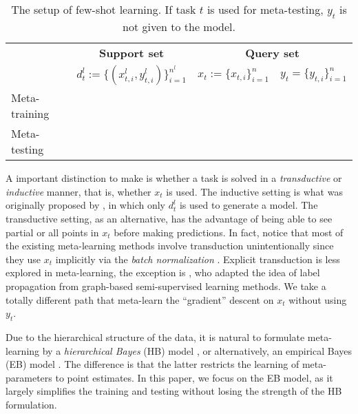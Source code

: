\documentclass{article} \usepackage{iclr2020_conference,times}
\newcommand{\chk}{{\centering\checkmark}}
\newcommand{\xmark}{\ding{55}}
\newcommand{\crs}{{\centering\xmark}}
\newcommand{\nt}{n}
\begin{document}
\begin{table}[ht]
    \centering
	\begin{tabular}{lccc}
    \toprule
        & \multicolumn{1}{c}{\textbf{Support set}} & \multicolumn{2}{c}{\textbf{Query set}} \\
        & $d_t^{l} := \{(x_{t,i}^{l}, y_{t,i}^{l})\}_{i=1}^{\nt^l}$ & $x_t := \{x_{t,i}\}_{i=1}^{\nt}$ & $y_t = \{ y_{t,i} \}_{i=1}^{\nt}$ \\
    \midrule
	    Meta-training & \chk & \chk & \chk \\
	    Meta-testing & \chk & \chk & \crs \\
	\bottomrule
    \end{tabular}
    \caption{The setup of few-shot learning. If task $t$ is used for meta-testing, $y_t$ is not given to the model.}
\label{tab:fs}
\end{table}

A important distinction to make is whether a task is solved in a \emph{transductive} or \emph{inductive} manner, 
that is, whether $x_t$ is used. The inductive setting is what was originally proposed by \citet{vinyals2016matching},
in which only $d_t^l$ is used to generate a model.
The transductive setting, as an alternative, has the advantage of being able to see partial or all points in $x_t$ before making predictions.
In fact, \citet{nichol2018first} notice that most of the existing meta-learning methods involve transduction unintentionally
since they use $x_t$ implicitly via the \emph{batch normalization} \citep{ioffe2015batch}.
Explicit transduction is less explored in meta-learning, the exception is \citet{liu2018learning}, 
who adapted the idea of label propagation \citep{zhu2003semi} from graph-based semi-supervised learning methods.
We take a totally different path that meta-learn the ``gradient'' descent on $x_t$ without using $y_t$.


Due to the hierarchical structure of the data, it is natural to formulate meta-learning by 
a \emph{hierarchical Bayes} (HB) model \citep{good1980some,berger1985}, 
or alternatively, an empirical Bayes (EB) model \citep{robbins1985empirical,kucukelbir2014population}. 
The difference is that the latter restricts the learning of meta-parameters to point estimates.
In this paper, we focus on the EB model, as it largely simplifies the training and testing without losing the strength of the HB formulation.
\end{document}
